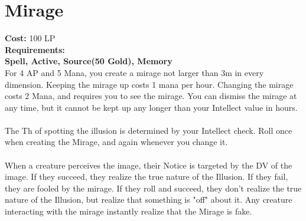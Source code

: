 \section{Mirage}\label{spell:mirage}
\textbf{Cost:} 100 LP\\
\textbf{Requirements:}\\
\textbf{Spell, Active, Source(50 Gold), Memory}\\
For 4 AP and 5 Mana, you create a mirage not larger than 3m in every dimension.
Keeping the mirage up costs 1 mana per hour.
Changing the mirage costs 2 Mana, and requires you to see the mirage.
You can dismiss the mirage at any time, but it cannot be kept up any longer than your Intellect value in hours.\\
\\
The Th of spotting the illusion is determined by your Intellect check.
Roll once when creating the Mirage, and again whenever you change it. \\
\\
When a creature perceives the image, their Notice is targeted by the DV of the image.
If they succeed, they realize the true nature of the Illusion.
If they fail, they are fooled by the mirage.
If they roll and succeed, they don't realize the true nature of the Illusion, but realize that something is "off" about it.
Any creature interacting with the mirage instantly realize that the Mirage is fake.\\